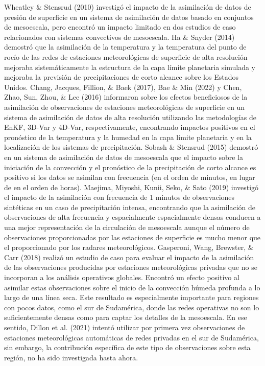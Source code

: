 \documentclass[12pt,twoside]{reedthesis}
\begin{document}
Wheatley \& Stensrud (2010) investigó el impacto de la asimilación de datos de presión de superficie en un sistema de asimilación de datos basado en conjuntos de mesoescala, pero encontró un impacto limitado en dos estudios de caso relacionados con sistemas convectivos de mesoescala. Ha \& Snyder (2014) demostró que la asimilación de la temperatura y la temperatura del punto de rocío de las redes de estaciones meteorológicas de superficie de alta resolución mejoraba sistemáticamente la estructura de la capa límite planetaria simulada y mejoraba la previsión de precipitaciones de corto alcance sobre los Estados Unidos. Chang, Jacques, Fillion, \& Baek (2017), Bae \& Min (2022) y Chen, Zhao, Sun, Zhou, \& Lee (2016) informaron sobre los efectos beneficiosos de la asimilación de observaciones de estaciones meteorológicas de superficie en un sistema de asimilación de datos de alta resolución utilizando las metodologías de EnKF, 3D-Var y 4D-Var, respectivamente, encontrando impactos positivos en el pronóstico de la temperatura y la humedad en la capa límite planetaria y en la localización de los sistemas de precipitación. Sobash \& Stensrud (2015) demostró en un sistema de asimilación de datos de mesoescala que el impacto sobre la iniciación de la convección y el pronóstico de la precipitación de corto alcance es positivo si los datos se asimilan con frecuencia (en el orden de minutos, en lugar de en el orden de horas). Maejima, Miyoshi, Kunii, Seko, \& Sato (2019) investigó el impacto de la asimilación con frecuencia de 1 minutos de observaciones sintéticas en un caso de precipitación intensa, encontrando que la asimilación de observaciones de alta frecuencia y espacialmente espacialmente densas conducen a una mejor representación de la circulación de mesoescala aunque el número de observaciones proporcionadas por las estaciones de superficie es mucho menor que el proporcionado por los radares meteorológicos. Gasperoni, Wang, Brewster, \& Carr (2018) realizó un estudio de caso para evaluar el impacto de la asimilación de las observaciones producidas por estaciones meteorológicas privadas que no se incorporan a los análisis operativos globales. Encontró un efecto positivo al asimilar estas observaciones sobre el inicio de la convección húmeda profunda a lo largo de una línea seca. Este resultado es especialmente importante para regiones con pocos datos, como el sur de Sudamérica, donde las redes operativas no son lo suficientemente densas como para captar los detalles de la mesoescala. En ese sentido, Dillon et al. (2021) intentó utilizar por primera vez observaciones de estaciones meteorológicas automáticas de redes privadas en el sur de Sudamérica, sin embargo, la contribución específica de este tipo de observaciones sobre esta región, no ha sido investigada hasta ahora.
\end{document}
